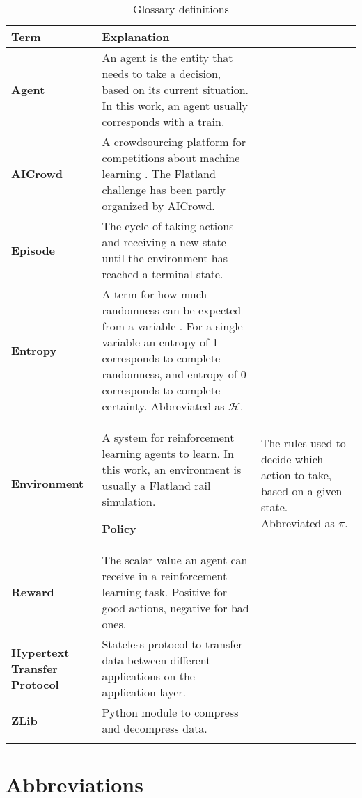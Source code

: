 \begin{longtable}{|m{3cm}|m{11cm}|}\hline
{} \textbf{Term}&
Explanation \\ 
\hline

\textbf{Agent}&
An agent is the entity that needs to take a decision, based on its current situation. In this work, an agent usually corresponds with a train.\\
\hline

\textbf{AICrowd}&
A crowdsourcing platform for competitions about machine learning \cite{aicrowd_startpage}. The Flatland challenge has been partly organized by AICrowd.\\ 
\hline

\textbf{Episode}&
The cycle of taking actions and receiving a new state until the environment has reached a terminal state. \\ 
\hline

\textbf{Entropy}&
A term for how much randomness can be expected from a variable \cite{entropy_shannon}.
For a single variable an entropy of 1 corresponds to complete randomness, and entropy of 0 corresponds to complete certainty.
Abbreviated as $\mathcal{H}$.\\ 
\hline

\textbf{Environment}&
A system for reinforcement learning agents to learn. In this work, an environment is usually a Flatland rail simulation.
\hline

\textbf{Policy}&
The rules used to decide which action to take, based on a given state. Abbreviated as $\pi$.\\ 
\hline

\textbf{Reward}&
The scalar value an agent can receive in a reinforcement learning task. Positive for good actions, negative for bad ones.\\ 
\hline

\textbf{Hypertext Transfer Protocol}&
Stateless protocol to transfer data between different applications on the application layer. \\ \hline

\textbf{ZLib}&
Python module to compress and decompress data. \\ \hline





\caption{Glossary definitions}
\label{tab:glossar}
\end{longtable}
\clearpage

\section{Abbreviations}\label{section:abkuerzungsverzeichnis}


